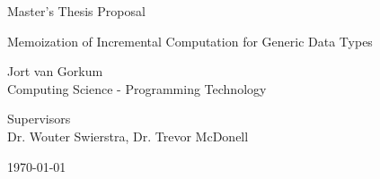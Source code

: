 \begin{titlepage}
  \fontsize{12pt}{15pt}\selectfont
  \begin{center}
    \vspace*{4cm}

    Master's Thesis Proposal

    \vspace{0.5cm}

    {
      \fontsize{20.74pt}{20.74pt}\selectfont
      \parbox[]{13cm} {
        \centering
        Memoization of Incremental Computation for Generic Data Types
      }
    }
      
    \vspace{1.25cm}
    
    Jort van Gorkum\\
    Computing Science - Programming Technology\\
    
    \vspace{1.25cm}
    
    Supervisors \\
    Dr. Wouter Swierstra, Dr. Trevor McDonell\\
    
    \vspace{1cm}

    \today
  \end{center}
\end{titlepage}